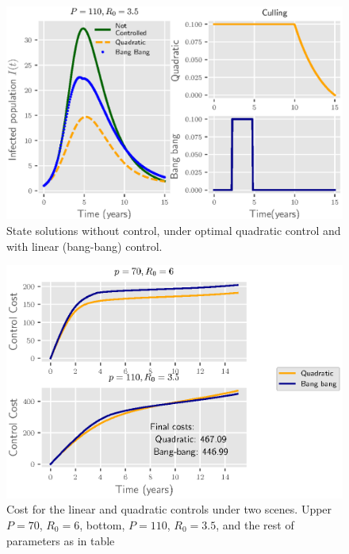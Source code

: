 \begin{figure}[h]
  \centering
  \includegraphics{Figures/figure_2_culling}
  \caption{State solutions without control, under optimal quadratic control 
  and with linear (bang-bang) control.}
  \label{fig:figure1culling}
\end{figure}

\begin{figure}[h]
  \centering
  \includegraphics{Figures/figure_3_culling}
  \caption{Cost for the linear and quadratic controls under two scenes. Upper
  $P=70$, $R_0=6$, bottom, $P=110$, $R_0=3.5$, and the rest of parameters as 
  in table}
  \label{fig:figure1culling}
\end{figure}